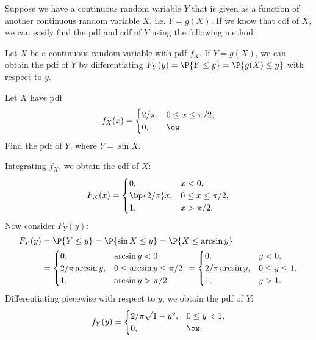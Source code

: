 Suppose we have a continuous random variable $Y$ that is given as a function of another continuous random variable $X$, i.e. $Y = g(X)$. If we know that cdf of $X$, we can easily find the pdf and cdf of $Y$ using the following method:

\begin{recipe}
    Let $X$ be a continuous random variable with pdf $f_X$. If $Y = g(X)$, we can obtain the pdf of $Y$ by differentiating $F_Y(y) = \P{Y \leq y} = \P{g(X) \leq y}$ with respect to $y$.
\end{recipe}

\begin{sample}
    Let $X$ have pdf \[f_X(x) = \begin{cases}
        2/\pi, & 0 \leq x \leq \pi/2,\\
        0, & \ow.
    \end{cases}\] Find the pdf of $Y$, where $Y = \sin X$.
\end{sample}
\begin{sampans}
    Integrating $f_X$, we obtain the cdf of $X$: \[F_X(x) = \begin{cases}
        0, & x < 0,\\
        \bp{2/\pi} x, & 0 \leq x \leq \pi/2,\\
        1, & x > \pi/2.
    \end{cases}\] Now consider $F_Y(y)$:
    \begin{align*}
        F_Y(y) &= \P{Y \leq y} = \P{\sin X \leq y} = \P{X \leq \arcsin y} \\
        &= \begin{cases}
            0, & \arcsin y < 0,\\
            2/\pi \arcsin y, & 0 \leq \arcsin y \leq \pi/2,\\
            1, & \arcsin y > \pi/2
        \end{cases} = \begin{cases}
            0, & y < 0,\\
            2/\pi \arcsin y, & 0 \leq y \leq 1,\\
            1, & y > 1.
        \end{cases}
    \end{align*}
    Differentiating piecewise with respect to $y$, we obtain the pdf of $Y$: \[f_Y(y) = \begin{cases}
        2/\pi\sqrt{1 - y^2}, & 0 \leq y < 1,\\
        0, & \ow.
    \end{cases}\]
\end{sampans}

